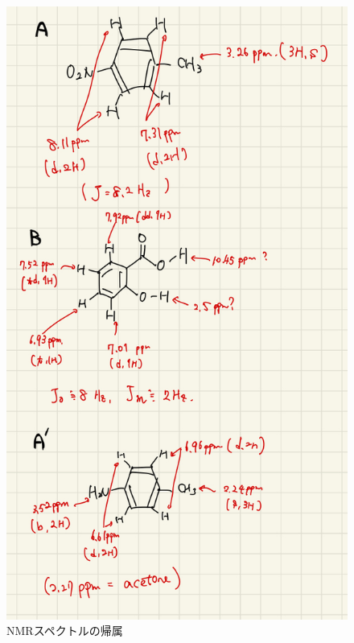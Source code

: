 \documentclass{ltjsarticle}
\theoremstyle{definition}
\numberwithin{equation}{section}
\begin{document}
\begin{figure}[htbp]
\begin{center}
\includegraphics[width = 10 cm]{NMR_5_attribute.jpeg}
\caption{NMRスペクトルの帰属}
\label{NMR_5_attiribute}
\end{center}
\end{figure}
\end{document}
